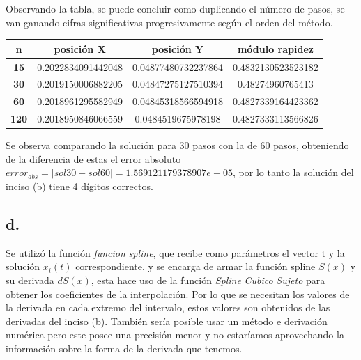 \documentclass[11pt]{article}
\begin{document}
Observando la tabla, se puede concluir como duplicando el número de pasos, se van ganando cifras significativas progresivamente según el orden del método.

\begin{table}[h]
	\centering
	\begin{tabular}{|c|c|c|c|}
		\hline
		\rowcolor[HTML]{38FFF8}
		\textbf{n}   & \textbf{posición X} & \textbf{posición Y} & \textbf{módulo rapidez} \\ \hline
		\textbf{15}  & 0.2022834091442048  & 0.04877480732237864 & 0.4832130523523182      \\ \hline
		\textbf{30}  & 0.2019150006882205  & 0.04847275127510394 & 0.48274960765413        \\ \hline
		\textbf{60}  & 0.2018961295582949  & 0.04845318566594918 & 0.4827339164423362      \\ \hline
		\textbf{120} & 0.2018950846066559  & 0.0484519675978198  & 0.4827333113566826      \\ \hline
	\end{tabular}
\end{table}

Se observa comparando la solución para 30 pasos con la de 60 pasos, obteniendo de la diferencia de estas el error absoluto $error_{abs}=|sol30-sol60|=1.569121179378907e-05$, por lo tanto la solución del inciso (b) tiene 4 dígitos correctos.

\subsection*{d.}

Se utilizó la función \textit{funcion$\_$spline}, que recibe como parámetros el vector t y la solución $x_i(t)$ correspondiente, y se encarga de armar la función spline $S(x)$ y su derivada $dS(x)$, esta hace uso de la función \textit{Spline$\_$Cubico$\_$Sujeto} para obtener los coeficientes de la interpolación. Por lo que se necesitan los valores de la derivada en cada extremo del intervalo, estos valores son obtenidos de las derivadas del inciso (b). También sería posible usar un método e derivación numérica pero este posee una precisión menor y no estaríamos aprovechando la información sobre la forma de la derivada que tenemos.
\end{document}

